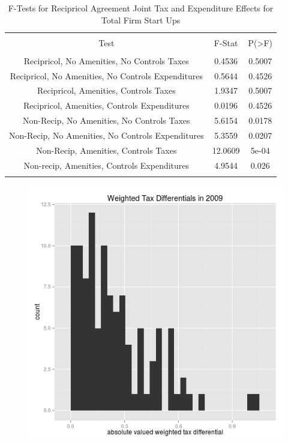 \documentclass[12pt,a4paper]{article}
\begin{document}
\begin{table}[!htbp] \centering 
  \caption{F-Tests for Recipricol Agreement Joint Tax and Expenditure Effects for Total Firm Start Ups} 
  \label{--Ftests} 
\begin{tabular}{@{\extracolsep{5pt}} ccc} 
\\[-1.8ex]\hline 
\hline \\[-1.8ex] 
Test & F-Stat & P(\textgreater F) \\ 
\hline \\[-1.8ex] 
Recipricol, No Amenities, No Controls Taxes & 0.4536 & 0.5007 \\ 
Recipricol, No Amenities, No Controls Expenditures & 0.5644 & 0.4526 \\ 
Recipricol, Amenities, Controls Taxes & 1.9347 & 0.5007 \\ 
Recipricol, Amenities, Controls Expenditures & 0.0196 & 0.4526 \\ 
Non-Recip, No Amenities, No Controls Taxes & 5.6154 & 0.0178 \\ 
Non-Recip, No Amenities, No Controls Expenditures & 5.3559 & 0.0207 \\ 
Non-Recip, Amenities, Controls Taxes & 12.0609 & 5e-04 \\ 
Non-recip, Amenities, Controls Expenditures & 4.9544 & 0.026 \\ 
\hline \\[-1.8ex] 
\end{tabular} 
\end{table} 

\begin{figure}[h]\label{weightedtax}
    \centering
    \includegraphics[scale = 0.5]{../analysis/output/_--_weightedtax.png}
\end{figure}
\end{document}
